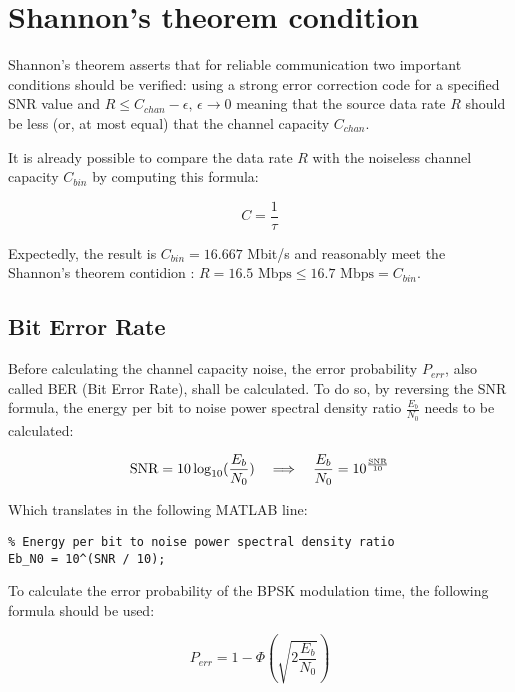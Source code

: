 \vspace{40px} \section{Shannon's theorem condition}
Shannon's theorem asserts that for reliable communication two important conditions should be verified: using a strong error correction code for a specified SNR value and $R \leq C_{chan} - \epsilon,\, \epsilon\to0$ meaning that the source data rate $R$ should be less (or, at most equal) that the channel capacity $C_{chan}$.

It is already possible to compare the data rate $R$ with the noiseless channel capacity $C_{bin}$ by computing this formula:

\begin{equation*}
    C = \frac{1}{\tau}
\end{equation*}

\noindent Expectedly, the result is $C_{bin} = 16.667$ Mbit/s and reasonably meet the Shannon's theorem contidion : $ R = 16.5 \text{ Mbps} \leq 16.7 \text{ Mbps} = C_{bin}$.


\subsection{Bit Error Rate}
Before calculating the channel capacity noise, the error probability $P_{err}$, also called BER (Bit Error Rate), shall be calculated. To do so, by reversing the SNR formula, the energy per bit to noise power spectral density ratio $\frac{E_b}{N_0}$ needs to be calculated:

\begin{equation*}
    \text{SNR} = 10\log_{10}(\frac{E_b}{N_0}) \hspace{10px} \Longrightarrow \hspace{10px} \frac{E_b}{N_0} = 10^{\frac{\text{SNR}}{10}}
\end{equation*}

\noindent Which translates in the following MATLAB line:

\begin{lstlisting}
% Energy per bit to noise power spectral density ratio
Eb_N0 = 10^(SNR / 10);
\end{lstlisting}

\noindent To calculate the error probability of the BPSK modulation time, the following formula should be used:

\begin{equation*}
    P_{err} = 1-\Phi\left( \sqrt{2\frac{E_b}{N_0}} \right)
\end{equation*}

